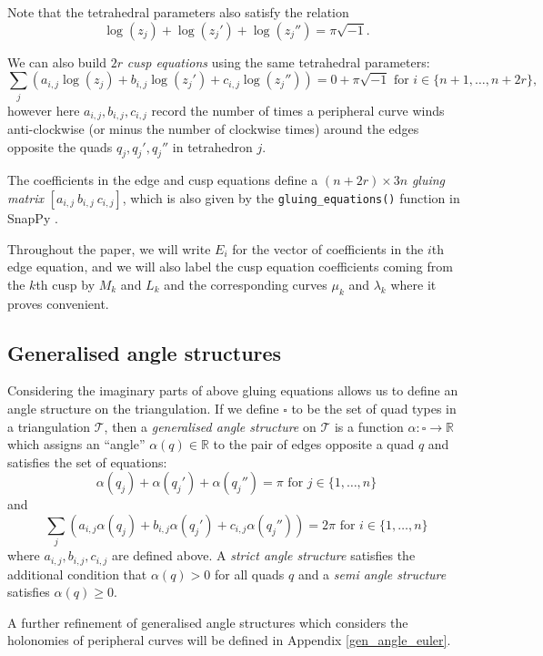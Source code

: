 \documentclass[12pt,reqno]{amsart}  %
\theoremstyle{definition}
\theoremstyle{remark}
\def\R{\mathbb{R}}
\def\be{  \begin{equation} }
\def\ee{  \end{equation} }
\newcommand{\T}{\mathcal{T}}
\def\quads{\square}  %
\begin{document}
Note that the tetrahedral parameters also satisfy the relation 
\be
\label{log_tet_eqns}
\log(z_j )+\log(z_j') + \log(z_j'')= \pi \sqrt{-1}.
\ee

We can also build $2r$ {\em cusp equations} using the same tetrahedral 
parameters: 
\be
\label{log_cusp_eqns}
\sum_j \left(a_{i,j} \log(z_j )
+ b_{i,j} \log(z_j' )+ c_{i,j} \log(z_j'')\right)
=0+\pi \sqrt{-1} \mbox{ for } i\in\{n+1,\ldots, n+2r\},
\ee
however here $a_{i,j},b_{i,j},c_{i,j}$ record the number of times a 
peripheral curve winds anti-clockwise (or minus the number of clockwise 
times) around the edges opposite the quads  $q_j, q_j', q_j''$ in 
tetrahedron $j$. 

The coefficients in the edge and cusp equations define a 
$(n+2r) \times 3n$ \emph{gluing matrix} $[ a_{i,j} ~ b_{i,j} ~ c_{i,j} ]$, 
which is also given by the {\tt gluing\_equations()} function in 
SnapPy \cite{SnapPy}.

Throughout the paper, we will write $E_i$ for the vector of coefficients 
in the $i$th edge equation, and we will also label the cusp equation 
coefficients coming from the $k$th cusp by $M_k$ and $L_k$ and the 
corresponding curves $\mu_k$ and $\lambda_k$ where it proves convenient.

\subsection{Generalised angle structures} 
\label{angle_struct_sect}

Considering the imaginary parts of above gluing equations allows us to 
define an angle structure on the triangulation. If we define $\quads$ 
to be the set of quad types in a triangulation $\T$, then a 
\emph{generalised angle structure} on $\T$ is a function 
$\alpha : \quads \to \R$ which assigns an ``angle'' 
$\alpha(q) \in \R$ to the pair of edges opposite a quad $q$
and satisfies the set of equations:  
\be 
\label{ang_struct1}
\alpha(q_j) + \alpha(q_j')+ \alpha(q_j'') = 
\pi \mbox{ for } j\in\{1,\ldots, n\} \ee
and
\be 
\label{ang_struct2}
\sum_j \left(a_{i,j} \alpha(q_j)+ b_{i,j} \alpha(q_j')
+ c_{i,j} \alpha(q_j'')\right)=2\pi \mbox{ for } i\in\{1,\ldots, n\} 
\ee
where $a_{i,j},b_{i,j},c_{i,j}$ are defined above. A 
\emph{strict angle structure} satisfies the additional condition that 
$\alpha(q)>0$ for all quads $q$ and a \emph{semi angle structure} 
satisfies $\alpha(q)\ge 0$.

A further refinement of generalised angle structures which considers the 
holonomies of peripheral curves will be defined in Appendix 
\ref{gen_angle_euler}.\\
\end{document}
